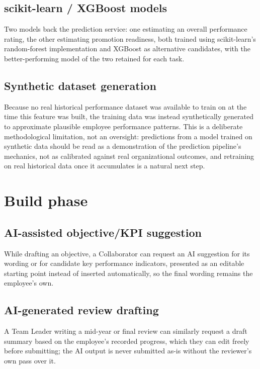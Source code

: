 \documentclass[12pt,a4paper]{report}
\begin{document}
\subsection{scikit-learn / XGBoost models}

Two models back the prediction service: one estimating an overall performance rating, the other estimating promotion readiness, both trained using scikit-learn's random-forest implementation and XGBoost as alternative candidates, with the better-performing model of the two retained for each task.

\subsection{Synthetic dataset generation}

Because no real historical performance dataset was available to train on at the time this feature was built, the training data was instead synthetically generated to approximate plausible employee performance patterns. This is a deliberate methodological limitation, not an oversight: predictions from a model trained on synthetic data should be read as a demonstration of the prediction pipeline's mechanics, not as calibrated against real organizational outcomes, and retraining on real historical data once it accumulates is a natural next step.

\section{Build phase}

\subsection{AI-assisted objective/KPI suggestion}

While drafting an objective, a Collaborator can request an AI suggestion for its wording or for candidate key performance indicators, presented as an editable starting point instead of inserted automatically, so the final wording remains the employee's own.

\subsection{AI-generated review drafting}

A Team Leader writing a mid-year or final review can similarly request a draft summary based on the employee's recorded progress, which they can edit freely before submitting; the AI output is never submitted as-is without the reviewer's own pass over it.
\end{document}
